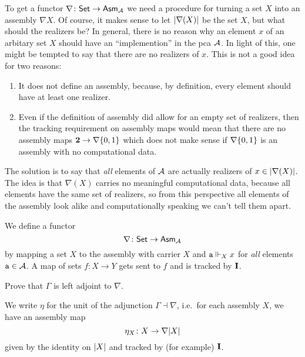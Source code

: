 To get a functor \(\nabla \colon \Set \to \Asm{\AA}\) we need a procedure for
turning a set \(X\) into an assembly \(\nabla X\).
%
Of course, it makes sense to let \(\carrier{\nabla(X)}\) be the set \(X\), but
what should the realizers be?
%
In general, there is no reason why an element \(x\) of an arbitary set \(X\)
should have an ``implemention'' in the pca \(\AA\).
%
In light of this, one might be tempted to say that there are no realizers of
\(x\). This is not a good idea for two reasons:
\begin{enumerate}[(1)]
\item It does not define an assembly, because, by definition, every element should
  have at least one realizer.
\item Even if the definition of assembly did allow for an empty set of
  realizers, then the tracking requirement on assembly maps would mean that
  there are no assembly maps \(\Two \to \nabla\set{0,1}\) which does not make
  sense if \(\nabla\set{0,1}\) is an assembly with no computational data.
\end{enumerate}

The solution is to say that \emph{all} elements of \(\AA\) are actually realizers
of \(x \in \carrier{\nabla(X)}\).
%
The idea is that \(\nabla(X)\) carries no meaningful computational data, because
all elements have the same set of realizers, so from this perspective all
elements of the assembly look alike and computationally speaking we can't tell
them apart.


\begin{definition}[\(\nabla\)]
  We define a functor
  \[
    \nabla \colon \Set \to \Asm{\AA}
  \]
  by mapping a set \(X\) to the assembly with carrier \(X\) and
  \(\pca{a} \realizes_X x\) for \emph{all} elements \(\pca{a} \in \AA\).
  A map of sets \(f \colon X \to Y\) gets sent to \(f\) and is tracked by
  \(\icomb\).
\end{definition}

\begin{exercise}\label{exer:Gamma-left-adjoint-to-nabla}
  Prove that \(\Gamma\) is left adjoint to \(\nabla\).
\end{exercise}

\begin{notation}[\(\eta\)]
  We write \(\eta\) for the unit of the adjunction \(\Gamma \dashv \nabla\),
  i.e.\ for each assembly \(X\), we have an assembly map
  \[
    \eta_X \colon X \to \nabla \carrier{X}
  \]
  given by the identity on \(\carrier{X}\) and tracked by (for example)
  \(\icomb\).
\end{notation}

